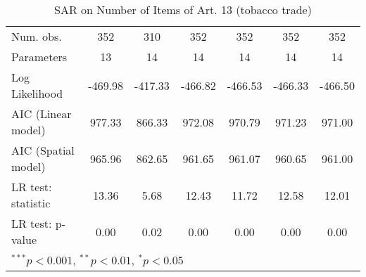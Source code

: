 \begin{table}[!h]
\begin{center}
\begin{tabular}{l c c c c c c }
\midrule
Num. obs.               & 352         & 310        & 352         & 352         & 352         & 352         \\
Parameters              & 13          & 14         & 14          & 14          & 14          & 14          \\
Log Likelihood          & -469.98     & -417.33    & -466.82     & -466.53     & -466.33     & -466.50     \\
AIC (Linear model)      & 977.33      & 866.33     & 972.08      & 970.79      & 971.23      & 971.00      \\
AIC (Spatial model)     & 965.96      & 862.65     & 961.65      & 961.07      & 960.65      & 961.00      \\
LR test: statistic      & 13.36       & 5.68       & 12.43       & 11.72       & 12.58       & 12.01       \\
LR test: p-value        & 0.00        & 0.02       & 0.00        & 0.00        & 0.00        & 0.00        \\
\bottomrule
\multicolumn{7}{l}{\scriptsize{$^{***}p<0.001$, $^{**}p<0.01$, $^*p<0.05$}}
\end{tabular}
\caption{SAR on Number of Items of Art. 13 (tobacco trade)}
\label{table:coefficients}
\end{center}
\end{table}
